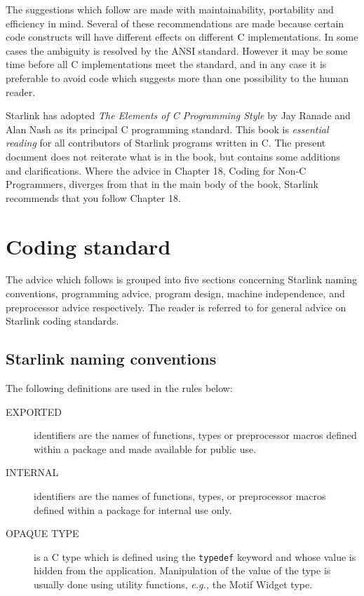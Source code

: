 The suggestions which follow are made with maintainability, portability and 
efficiency in mind.
Several of these recommendations are made because certain code constructs 
will have different effects on different C  implementations.
In some cases the ambiguity is resolved by the ANSI  standard.
However it may be some time before all C implementations meet the standard,
and in any case it is preferable to avoid code which suggests more than one
possibility to the human reader.

Starlink has adopted {\sl The Elements of C Programming Style} by Jay Ranade 
and Alan Nash as its principal C programming standard.  This book is 
{\it essential reading}\/ for all contributors of Starlink programs written in 
C. The present document does not reiterate 
what is in the book, but contains some additions and clarifications.  Where 
the advice in Chapter 18, Coding for Non-C Programmers, diverges from 
that in the main body of the book, Starlink recommends that you follow  
Chapter 18.


\section{Coding standard}

The advice which follows is grouped into five sections concerning 
Starlink naming conventions, programming advice, program design, 
machine independence, and preprocessor advice respectively.  The reader is 
referred to  for general advice on Starlink coding standards.

\subsection{Starlink naming conventions}

The following definitions are used in the rules below:

\begin{description}
\item [EXPORTED] identifiers are the names of functions, types or preprocessor 
macros defined within a package and made available for public use.
\item [INTERNAL] identifiers are the names of functions, types, or 
preprocessor macros defined within a package for internal use only.
\item [OPAQUE TYPE] is a C type which is defined using the \verb~typedef~ 
keyword and whose 
value is hidden from the application.  Manipulation of the value of the type 
is usually done using utility functions, {\em e.g.,} the Motif Widget type.
\end{description}


